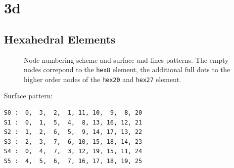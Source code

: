 \section{3d}
\subsection{Hexahedral Elements}

\begin{figure}[h!]
\begin{center}
\caption{Node numbering scheme and surface and lines patterns. The empty nodes correpond to the \texttt{hex8} element, the additional full dots to the higher order nodes of the \texttt{hex20} and \texttt{hex27} element.}
\label{fig:conventions:hex}
\end{center}
\end{figure}

Surface pattern:
\begin{verbatim}
S0 :  0,  3,  2,  1, 11, 10,  9,  8, 20
S1 :  0,  1,  5,  4,  8, 13, 16, 12, 21
S2 :  1,  2,  6,  5,  9, 14, 17, 13, 22
S3 :  2,  3,  7,  6, 10, 15, 18, 14, 23
S4 :  0,  4,  7,  3, 12, 19, 15, 11, 24
S5 :  4,  5,  6,  7, 16, 17, 18, 19, 25
\end{verbatim}

